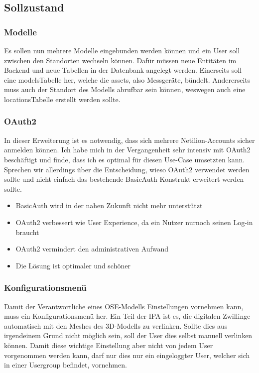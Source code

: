 \subsection{Sollzustand} \label{soll-zustand}
\subsubsection{Modelle}
Es sollen nun mehrere Modelle eingebunden werden können und ein User soll zwischen den Standorten wechseln können. Dafür müssen neue Entitäten im Backend und neue Tabellen in der Datenbank angelegt werden. Einerseits soll eine \flqq models\frqq Tabelle her, welche die \flqq assets\frqq , also Messgeräte, bündelt. Andererseits muss auch der Standort des Modells abrufbar sein können, weswegen auch eine \flqq locations\frqq Tabelle erstellt werden sollte.
\subsubsection{OAuth2}
In dieser Erweiterung ist es notwendig, dass sich mehrere Netilion-Accounts sicher anmelden können. Ich habe mich in der Vergangenheit sehr intensiv mit OAuth2 beschäftigt und finde, dass ich es optimal für diesen Use-Case umsetzten kann. Sprechen wir allerdings über die Entscheidung, wieso OAuth2 verwendet werden sollte und nicht einfach das bestehende BasicAuth Konstrukt erweitert werden sollte.
\begin{itemize}
  \item BasicAuth wird in der nahen Zukunft nicht mehr unterstützt
  \item OAuth2 verbessert wie User Experience, da ein Nutzer nurnoch seinen Log-in braucht
  \item OAuth2 vermindert den administrativen Aufwand
  \item Die Lösung ist optimaler und schöner
\end{itemize}
\subsubsection{Konfigurationsmenü}
Damit der Verantwortliche eines OSE-Modells Einstellungen vornehmen kann, muss ein Konfigurationsmenü her. Ein Teil der IPA ist es, die digitalen Zwillinge automatisch mit den Meshes des 3D-Modells zu verlinken. Sollte dies aus irgendeinem Grund nicht möglich sein, soll der User dies selbst manuell verlinken können. Damit diese wichtige Einstellung aber nicht von jedem User vorgenommen werden kann, darf nur dies nur ein eingeloggter User, welcher sich in einer Usergroup befindet, vornehmen.
